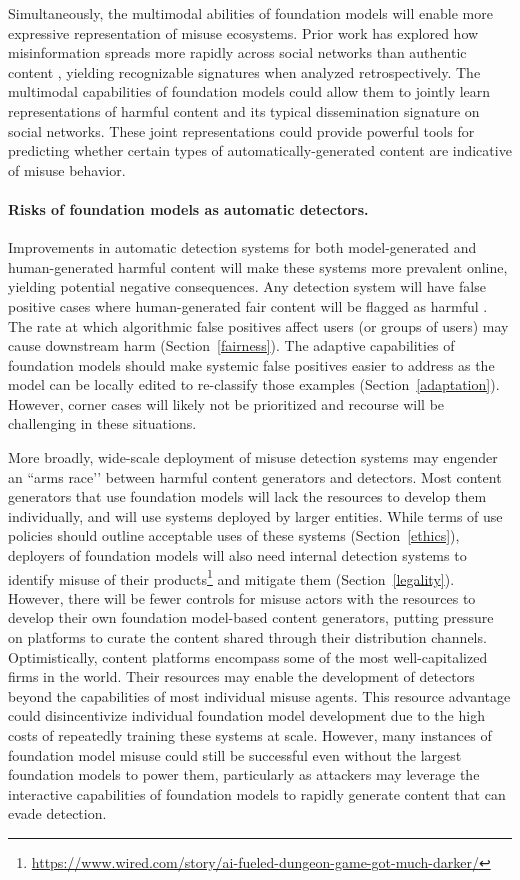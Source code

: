 Simultaneously, the multimodal abilities of foundation models will enable more expressive representation of misuse ecosystems. Prior work has explored how misinformation spreads more rapidly across social networks than authentic content \citep{Starbird2018,Vosoughi1146}, yielding recognizable signatures when analyzed retrospectively. The multimodal capabilities of foundation models could allow them to jointly learn representations of harmful content and its typical dissemination signature on social networks. These joint representations could provide powerful tools for predicting whether certain types of automatically-generated content are indicative of misuse behavior. 

\paragraph{Risks of foundation models as automatic detectors.} Improvements in automatic detection systems for both model-generated and human-generated harmful content will make these systems more prevalent online, yielding potential negative consequences. Any detection system will have false positive cases where human-generated fair content will be flagged as harmful \citep{sap-etal-2019-risk,xu-etal-2021-detoxifying}. The rate at which algorithmic false positives affect users (or groups of users) may cause downstream harm (Section~\ref{fairness}). The adaptive capabilities of foundation models should make systemic false positives easier to address as the model can be locally edited to re-classify those examples (Section~\ref{adaptation}). 
However, corner cases will likely not be prioritized and recourse will be challenging in these situations.

More broadly, wide-scale deployment of misuse detection systems may engender an ``arms race’’ between harmful content generators and detectors. Most content generators that use foundation models will lack the resources to develop them individually, and will use systems deployed by larger entities. While terms of use policies should outline acceptable uses of these systems (Section~\ref{ethics}), deployers of foundation models will also need internal detection systems to identify misuse of their products\footnote{\url{https://www.wired.com/story/ai-fueled-dungeon-game-got-much-darker/}} and mitigate them (Section~\ref{legality}). 
However, there will be fewer controls for misuse actors with the resources to develop their own foundation model-based content generators, putting pressure on platforms to curate the content shared through their distribution channels. Optimistically, content platforms encompass some of the most well-capitalized firms in the world. Their resources may enable the development of  detectors beyond the capabilities of most individual misuse agents. This resource advantage could disincentivize individual foundation model development due to the high costs of repeatedly training these systems at scale. However, many instances of foundation model misuse could still be successful even without the largest foundation models to power them, particularly as attackers may leverage the interactive capabilities of foundation models to rapidly generate content that can evade detection.

